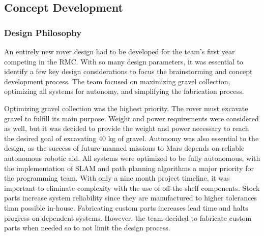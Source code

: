 \documentclass[class=article, crop=false]{standalone}
\begin{document}
	\subsection{Concept Development}
	\label{subsec:concept_development}
	\subsubsection{Design Philosophy}
	An entirely new rover design had to be developed for the team’s first year competing in the RMC. With so many design parameters, it was essential to identify a few key design considerations to focus the brainstorming and concept development process. The team focused on maximizing gravel collection, optimizing all systems for autonomy, and simplifying the fabrication process.
	
	
Optimizing gravel collection was the highest priority. The rover must excavate gravel to fulfill its main purpose. Weight and power requirements were considered as well, but it was decided to provide the weight and power necessary to reach the desired goal of excavating 40 kg of gravel. Autonomy was also essential to the design, as the success of future manned missions to Mars depends on reliable autonomous robotic aid. All systems were optimized to be fully autonomous, with the implementation of SLAM and path planning algorithms a major priority for the programming team. With only a nine month project timeline, it was important to eliminate complexity with the use of off-the-shelf components. Stock parts increase system reliability since they are manufactured to higher tolerances than possible in-house. Fabricating custom parts increases lead time and halts progress on dependent systems. However, the team decided to fabricate custom parts when needed so to not limit the design process.
\end{document}
